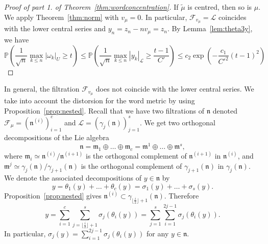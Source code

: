 \documentclass[11pt,leqno]{article}
\theoremstyle{plain}
\theoremstyle{definition}
\theoremstyle{remark}
\numberwithin{equation}{section}
\begin{document}
 
\begin{proof}[Proof of part 1. of Theorem~\ref{thm:wordconcentration}]
If $\tilde{\mu}$ is centred, then so is $\mu$. We apply Theorem~\ref{thm:norm} with $v_\mu=0$. In particular, $\mathcal{F}_{v_\mu}=\mathcal{L}$ coincides with the lower central series and $y_n=z_n-nv_\mu=z_n$.  By Lemma~\ref{lem:theta3y}, we have
\[
\mathbb{P}\left(\frac{1}{\sqrt{n}}\max_{k\le n} |\omega_k|_U\ge t\right) \le \mathbb{P}\left(\frac{1}{\sqrt{n}}\max_{k\le n} |y_k|_{\mathcal{L}}\ge \frac{t-1}{C'}\right)\le c_2\exp\left(-\frac{c_1}{C'^2} (t-1)^2\right)
\]
\end{proof}


In general, the filtration $\mathcal{F}_{v_\mu}$  does not coincide with the lower central series. We take into account the distorsion for the word metric by using Proposition~\ref{prop:nested}. Recall that we have two filtrations of $\mathfrak{n}$ denoted $\mathcal{F}_{\mu}=(\mathfrak{n}^{(i)})_{i=1}^c$ and $\mathcal{L}=(\gamma_j(\mathfrak{n}))_{j=1}^s$. We get two orthogonal decompositions of the Lie algebra
\[
\mathfrak{n}=\mathfrak{m}_{1}\oplus\dots\oplus\mathfrak{m}_{c}=\mathfrak{m}^{1}\oplus\dots\oplus\mathfrak{m}^{s},
\]
where $\mathfrak{m}_{i}\simeq \mathfrak{n}^{(i)}/\mathfrak{n}^{(i+1)}$ is the orthogonal complement of $\mathfrak{n}^{(i+1)}$ in $\mathfrak{n}^{(i)}$, and $\mathfrak{m}^{j}\simeq \gamma_j(\mathfrak{n})/\gamma_{j+1}(\mathfrak{n})$ is the orthogonal complement of $\gamma_{j+1}(\mathfrak{n})$ in $\gamma_j(\mathfrak{n})$. We denote the associated decompositions of $y\in \mathfrak{n}$ by
\[
y=\theta_1(y)+\dots+\theta_c(y)=\sigma_1(y)+\dots+\sigma_s(y).
\]
Proposition~\ref{prop:nested} gives $\mathfrak{n}^{(i)}\subset \gamma_{\lfloor\frac{i}{2}\rfloor+1}(\mathfrak{n})$. Therefore 
\[
y=\sum_{i=1}^c\sum_{j=\lfloor\frac{i}{2}\rfloor+1}^s \sigma_j(\theta_i(y))=\sum_{j=1}^s \sum_{i=1}^{2j-1} \sigma_j(\theta_i(y)).
\]
In particular, $\sigma_j(y)=\sum_{i=1}^{2j-1} \sigma_j(\theta_i(y))$ for any $y\in \mathfrak{n}$.
\end{document}
